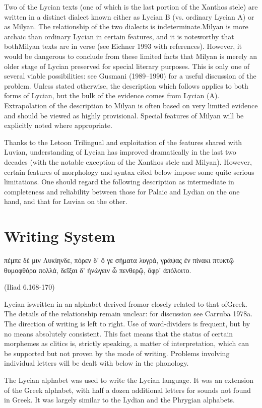 Two of the Lycian texts (one of which is the last portion of the Xanthos stele) are written
in a distinct dialect known either as Lycian B (vs. ordinary Lycian A) or as Milyan. The
relationship of the two dialects is indeterminate.Milyan is more archaic than ordinary Lycian
in certain features, and it is noteworthy that bothMilyan texts are in verse (see Eichner 1993
with references). However, it would be dangerous to conclude from these limited facts that
Milyan is merely an older stage of Lycian preserved for special literary purposes. This is only
one of several viable possibilities: see Gusmani (1989–1990) for a useful discussion of the
problem. Unless stated otherwise, the description which follows applies to both forms of
Lycian, but the bulk of the evidence comes from Lycian (A). Extrapolation of the description
to Milyan is often based on very limited evidence and should be viewed as highly provisional.
Special features of Milyan will be explicitly noted where appropriate.

Thanks to the Letoon Trilingual and exploitation of the features shared with Luvian,
understanding of Lycian has improved dramatically in the last two decades (with the notable
exception of the Xanthos stele and Milyan). However, certain features of morphology and
syntax cited below impose some quite serious limitations. One should regard the following
description as intermediate in completeness and reliability between those for Palaic and
Lydian on the one hand, and that for Luvian on the other.


\section{Writing System}
\epigraph{{\panunicode πέμπε δὲ μιν Λυκίηνδε, πόρεν δ’ ὅ γε σήματα λυγρά,
γράψας ἐν πίνακι πτυκτῷ θυμοφθόρα πολλά,
δεῖξαι δ’ ἠνώγειν ὧ πενθερῷ, ὄφρ’ ἀπόλοιτο.}}{(Iliad 6.168-170)}


Lycian iswritten in an alphabet derived fromor closely related to that ofGreek. The details of
the relationship remain unclear: for discussion see Carruba 1978a. The direction of writing
is left to right. Use of word-dividers is frequent, but by no means absolutely consistent. This
fact means that the status of certain morphemes as clitics is, strictly speaking, a matter of
interpretation, which can be supported but not proven by the mode of writing. Problems
involving individual letters will be dealt with below in the phonology.

The Lycian alphabet was used to write the Lycian language. It was an extension of the Greek alphabet, with half a dozen additional letters for sounds not found in Greek. It was largely similar to the Lydian and the Phrygian alphabets.

